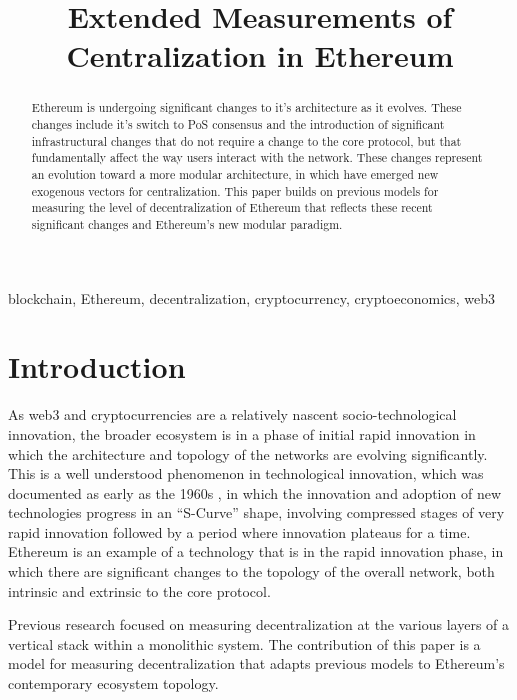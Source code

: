\documentclass[conference]{IEEEtran}
\begin{document}
\title{Extended Measurements of Centralization in Ethereum}

\author{
}

\maketitle

\begin{abstract}
Ethereum is undergoing significant changes to it's architecture as it evolves.  These changes include it's switch to PoS consensus and the introduction of significant infrastructural changes that do not require a change to the core protocol, but that fundamentally affect the way users interact with the network.  These changes represent an evolution toward a more modular architecture, in which have emerged new exogenous vectors for centralization.  This paper builds on previous models for measuring the level of decentralization of Ethereum that reflects these recent significant changes and Ethereum's new modular paradigm.
\end{abstract}

\begin{IEEEkeywords}
blockchain, Ethereum, decentralization, cryptocurrency, cryptoeconomics, web3
\end{IEEEkeywords}

\section{Introduction}

As web3 and cryptocurrencies are a relatively nascent socio-technological innovation, the broader ecosystem is in a phase of initial rapid innovation in which the architecture and topology of the networks are evolving significantly.  This is a well understood phenomenon in technological innovation, which was documented as early as the 1960s \cite{rogers2010diffusion}, in which the innovation and adoption of new technologies progress in an “S-Curve” shape, involving compressed stages of very rapid innovation followed by a period where innovation plateaus for a time.  Ethereum is an example of a technology that is in the rapid innovation phase, in which there are significant changes to the topology of the overall network, both intrinsic and extrinsic to the core protocol.

Previous research \cite{gochhayat2020measuring, lin2021measuring, karakostas2022sok} focused on measuring decentralization at the various layers of a vertical stack within a monolithic system.  The contribution of this paper is a model for measuring decentralization that adapts previous models to Ethereum's contemporary ecosystem topology.
\end{document}
